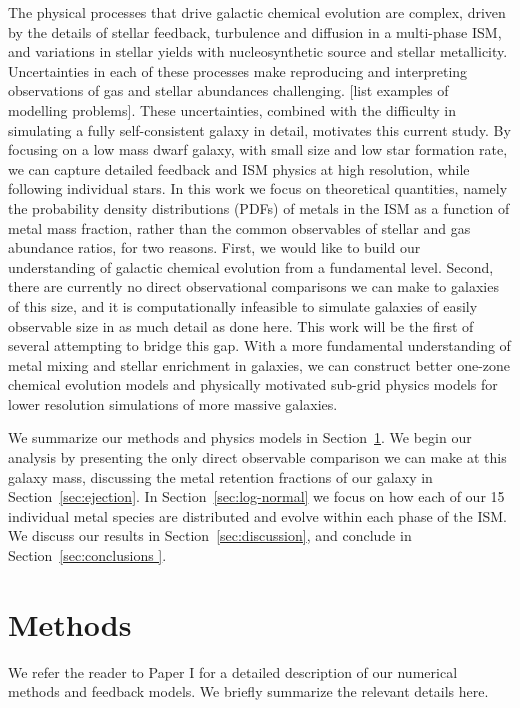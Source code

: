 \documentclass[twocolumn]{aastex61}
\begin{document}
The physical processes that drive galactic chemical evolution are complex, driven by the details of stellar feedback, turbulence and diffusion in a multi-phase ISM, and variations in stellar yields with nucleosynthetic source and stellar metallicity. Uncertainties in each of these processes make reproducing and interpreting observations of gas and stellar abundances challenging. [list examples of modelling problems]. These uncertainties, combined with the difficulty in simulating a fully self-consistent galaxy in detail, motivates this current study. By focusing on a low mass dwarf galaxy, with small size and low star formation rate, we can capture detailed feedback and ISM physics at high resolution, while following individual stars. In this work we focus on theoretical quantities, namely the probability density distributions (PDFs) of metals in the ISM as a function of metal mass fraction, rather than the common observables of stellar and gas abundance ratios, for two reasons. First, we would like to build our understanding of galactic chemical evolution from a fundamental level. Second, there are currently no direct observational comparisons we can make to galaxies of this size, and it is computationally infeasible to simulate galaxies
  of easily observable size
in as much detail as done here. This work will be the first of several attempting to bridge this gap. With a more fundamental understanding of metal mixing and stellar enrichment in galaxies, we can construct better one-zone chemical evolution models and physically motivated sub-grid physics models for lower resolution simulations of more massive galaxies.

We summarize our methods and physics models in Section~\ref{sec:methods}. We begin our analysis by presenting the only direct observable comparison we can make at this galaxy mass, discussing the metal retention fractions of our galaxy in Section~\ref{sec:ejection}. In Section~\ref{sec:log-normal} we focus on how each of our 15 individual metal species are distributed and evolve within each phase of the ISM.
   We discuss our results in Section~\ref{sec:discussion}, and conclude in
   Section~\ref{sec:conclusions  }.

\section{Methods}
\label{sec:methods}
We refer the reader to Paper I for a detailed description of our numerical methods and feedback models. We briefly summarize the relevant details here.
\end{document}
